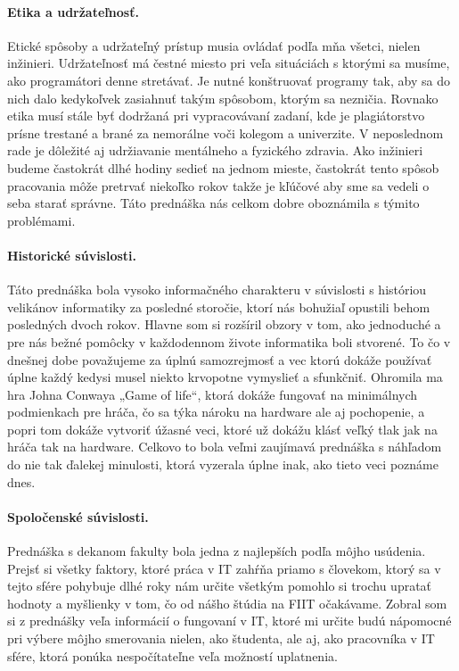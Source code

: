 \documentclass[10pt,twoside,slovak,a4paper]{article}										%
\begin{document}
\paragraph{Etika a udržateľnosť. } 
Etické spôsoby a udržateľný prístup musia ovládať podľa mňa všetci, nielen inžinieri. Udržateľnosť má čestné miesto pri veľa situáciách s ktorými sa musíme, ako programátori denne stretávať. Je nutné konštruovať programy tak, aby sa do nich dalo kedykoľvek zasiahnuť takým spôsobom, ktorým sa nezničia. Rovnako etika musí stále byť dodržaná pri vypracovávaní zadaní, kde je plagiátorstvo prísne trestané a brané za nemorálne voči kolegom a univerzite. V neposlednom rade je dôležité aj udržiavanie mentálneho a fyzického zdravia. Ako inžinieri budeme častokrát dlhé hodiny sedieť na jednom mieste, častokrát tento spôsob pracovania môže pretrvať niekoľko rokov takže je kľúčové aby sme sa vedeli o seba starať správne. Táto prednáška nás celkom dobre oboznámila s týmito problémami.~\cite{etics:zdroj}


\paragraph{Historické súvislosti.} 
Táto prednáška bola vysoko informačného charakteru v súvislosti s históriou velikánov informatiky za posledné storočie, ktorí nás bohužiaľ opustili behom posledných dvoch rokov. Hlavne som si rozšíril obzory v tom, ako jednoduché a pre nás bežné pomôcky v každodennom živote informatika boli stvorené. To čo v dnešnej dobe považujeme za úplnú samozrejmosť a vec ktorú dokáže používať úplne každý kedysi musel niekto krvopotne vymyslieť a sfunkčniť. Ohromila ma hra Johna Conwaya „Game of life“, ktorá dokáže fungovať na minimálnych podmienkach pre hráča, čo sa týka nároku na hardware ale aj pochopenie, a popri tom dokáže vytvoriť úžasné veci, ktoré už dokážu klásť veľký tlak jak na hráča tak na hardware. Celkovo to bola veľmi zaujímavá prednáška s náhľadom do nie tak ďalekej minulosti, ktorá vyzerala úplne inak, ako tieto veci poznáme dnes. ~\cite{sedem:zdroj}


\paragraph{Spoločenské súvislosti.} 
Prednáška s dekanom fakulty bola jedna z najlepších podľa môjho usúdenia. Prejsť si všetky faktory, ktoré práca v IT zahŕňa priamo s človekom, ktorý sa v tejto sfére pohybuje dlhé roky nám určite všetkým pomohlo si trochu upratať hodnoty a myšlienky v tom, čo od nášho štúdia na FIIT očakávame. Zobral som si z prednášky veľa informácií o fungovaní v IT, ktoré mi určite budú nápomocné pri výbere môjho smerovania nielen, ako študenta, ale aj, ako pracovníka v IT sfére, ktorá ponúka nespočítateľne veľa možností uplatnenia.~\cite{naco:zdroj}
\end{document}
